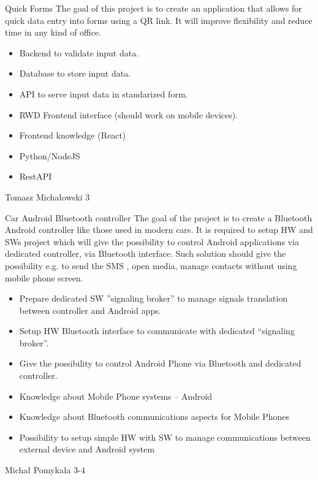 \begin{project}
{Quick Forms}
{The goal of this project is to create an application that allows for quick data entry into forms using a QR link. It will improve flexibility and reduce time in any kind of office.}
{
\begin{itemize}
	\item Backend to validate input data.
	\item Database to store input data.
	\item API to serve input data in standarized form.
	\item RWD Frontend interface (should work on mobile devices).
\end{itemize}
}
{
\begin{itemize}
	\item Frontend knowledge (React)
	\item Python/NodeJS
	\item RestAPI
\end{itemize}
}
{Tomasz Michałowski}
{3}
\end{project}
\begin{project}
{Car Android Bluetooth controller}
{The goal of the project is to create a Bluetooth Android controller like those used in modern cars. It is required to setup HW and SWs project which will give the possibility to control Android applications via dedicated controller, via Bluetooth interface. Such solution should give the possibility e.g. to send the SMS , open media, manage contacts without using mobile phone screen.}
{
\begin{itemize}
	\item Prepare dedicated SW ”signaling broker” to manage signals translation between controller and Android apps.
	\item Setup HW Bluetooth interface to communicate with dedicated “signaling broker”.
	\item Give the possibility to control Android Phone via Bluetooth and dedicated controller.
\end{itemize}
}
{
\begin{itemize}
	\item Knowledge about Mobile Phone systems – Android
	\item Knowledge about Bluetooth communications aspects for Mobile Phones
	\item Possibility to setup simple HW with SW to manage communications between external device and Android system
\end{itemize}
}
{Michał Pomykała}
{3-4}
\end{project}
